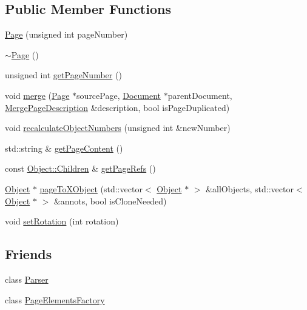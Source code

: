 \subsection*{Public Member Functions}
\begin{DoxyCompactItemize}
\item 
\hyperlink{classmerge__lib_1_1_page_aa52175576e1fb031ce196e6c15a5f6ed}{Page} (unsigned int page\-Number)
\item 
\hyperlink{classmerge__lib_1_1_page_a2341fff1cc032ab6528874175e7dd841}{$\sim$\-Page} ()
\item 
unsigned int \hyperlink{classmerge__lib_1_1_page_af87022d9114f62bbf82cceffe9e52750}{get\-Page\-Number} ()
\item 
void \hyperlink{classmerge__lib_1_1_page_ab743f0a5867701d8be79af076f02a6fd}{merge} (\hyperlink{classmerge__lib_1_1_page}{Page} $\ast$source\-Page, \hyperlink{classmerge__lib_1_1_document}{Document} $\ast$parent\-Document, \hyperlink{structmerge__lib_1_1_merge_page_description}{Merge\-Page\-Description} \&description, bool is\-Page\-Duplicated)
\item 
void \hyperlink{classmerge__lib_1_1_page_ad678b5944cf1fc7e59dca7e51f36fe93}{recalculate\-Object\-Numbers} (unsigned int \&new\-Number)
\item 
std\-::string \& \hyperlink{classmerge__lib_1_1_page_a44ee21d43416ffe184aae26532e5fae8}{get\-Page\-Content} ()
\item 
const \hyperlink{classmerge__lib_1_1_object_a4e1f3bf43d9fc39fea3829f7ae1da4a8}{Object\-::\-Children} \& \hyperlink{classmerge__lib_1_1_page_a276d1b8ec3698c7e92c6c04614136b28}{get\-Page\-Refs} ()
\item 
\hyperlink{classmerge__lib_1_1_object}{Object} $\ast$ \hyperlink{classmerge__lib_1_1_page_a791406130fe3cd5b50923100eca1acf9}{page\-To\-X\-Object} (std\-::vector$<$ \hyperlink{classmerge__lib_1_1_object}{Object} $\ast$ $>$ \&all\-Objects, std\-::vector$<$ \hyperlink{classmerge__lib_1_1_object}{Object} $\ast$ $>$ \&annots, bool is\-Clone\-Needed)
\item 
void \hyperlink{classmerge__lib_1_1_page_ae68588d9882b3cdec7e46650c0de6111}{set\-Rotation} (int rotation)
\end{DoxyCompactItemize}
\subsection*{Friends}
\begin{DoxyCompactItemize}
\item 
class \hyperlink{classmerge__lib_1_1_page_ab80291af9c262f63b83fa9c16f12014d}{Parser}
\item 
class \hyperlink{classmerge__lib_1_1_page_ae6313e6ba562663368267af32ecf3ac0}{Page\-Elements\-Factory}
\end{DoxyCompactItemize}


